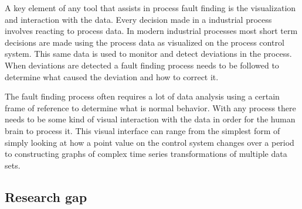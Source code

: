 A key element of any tool that assists in process fault finding is the visualization and interaction with the data. Every decision made in a industrial process involves reacting to process data. In modern industrial processes most short term decisions are made using the process data as visualized on the process control system. This same data is used to monitor and detect deviations in the process. When deviations are detected a fault finding process needs to be followed to determine what caused the deviation and how to correct it.\par
The fault finding process often requires a lot of data analysis using a certain frame of reference to determine what is normal behavior. With any process there needs to be some kind of visual interaction with the data in order for the human brain to process it. This visual interface can range from the simplest form of simply looking at how a point value on the control system changes over a period to constructing graphs of complex time series transformations of multiple data sets.\par

\subsection{Research gap}

